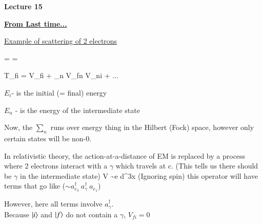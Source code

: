 



\thispagestyle{fancy}

\begin{center}
{\huge \textbf{Lecture 15}}
\end{center}

{\fontsize{14}{16}\selectfont

\textbf{\underline{From Last time...}} 

 
\underline{Example of scattering of 2 electrons}

\be
{} =  \hspace*{1in}   = 
\ee


\be
T_{fi} = V_{fi} + \sum_n V_{fn}  V_{ni} + ...
\ee

\bi
\item[-] $E_i$- is the initial (= final) energy
\item[-] $E_n$ - is the energy of the intermediate state
\ei

Now, the $\sum_n$ runs over energy thing in the Hilbert (Fock) space, however only certain states will be non-0.

In relativistic theory, the action-at-a-distance of EM is replaced by a process where 2 electrons interact with a $\gamma$ which travels at c. 
(This tells us there should be $\gamma$ in the intermediate state)
\be
V \sim e \int d^3x \psi \phi \psi  \hspace*{0.3in} \textrm{(Ignoring spin)}
\ee
this operator will have terms that go like ($\sim a_{e_3}^\dagger\ a_{\gamma}^\dagger\ a_{e_1}$)


However, here all terms involve $a_{\gamma}^\dagger$.\\
Because $\ket{i}$ and $\ket{f}$ do not contain a $\gamma$, $  V_{fi} = 0$

}
